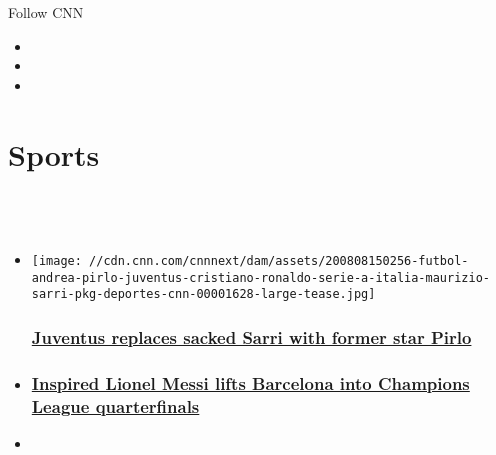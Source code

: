 Follow CNN

\begin{itemize}
\item
\item
\item
\end{itemize}

\hypertarget{sports}{%
\section{Sports}\label{sports}}

\hypertarget{-}{%
\subsection{~}\label{-}}

\begin{itemize}
\item
  \href{/2020/08/08/football/football-juventus-sack-sarri-ronaldo-spt-intl/index.html}{}

  \texttt{[image: //cdn.cnn.com/cnnnext/dam/assets/200808150256-futbol-andrea-pirlo-juventus-cristiano-ronaldo-serie-a-italia-maurizio-sarri-pkg-deportes-cnn-00001628-large-tease.jpg]}

  \hypertarget{juventus-replaces-sacked-sarri-with-former-star-pirlo}{%
  \subsubsection{\texorpdfstring{\href{/2020/08/08/football/football-juventus-sack-sarri-ronaldo-spt-intl/index.html}{Juventus
  replaces sacked Sarri with former star
  Pirlo}}{Juventus replaces sacked Sarri with former star Pirlo}}\label{juventus-replaces-sacked-sarri-with-former-star-pirlo}}
\item
  \hypertarget{inspired-lionel-messi-lifts-barcelona-into-champions-league-quarterfinals}{%
  \subsubsection{\texorpdfstring{\href{/2020/08/08/football/football-champions-league-barcelona-messi-bayern-munich/index.html}{Inspired
  Lionel Messi lifts Barcelona into Champions League
  quarterfinals}}{Inspired Lionel Messi lifts Barcelona into Champions League quarterfinals}}\label{inspired-lionel-messi-lifts-barcelona-into-champions-league-quarterfinals}}
\item
  \hypertarget{a-city-ruined-in-30-seconds-lebanese-basketball-great-weeps-for-beirut}{%
}
\end{itemize}
